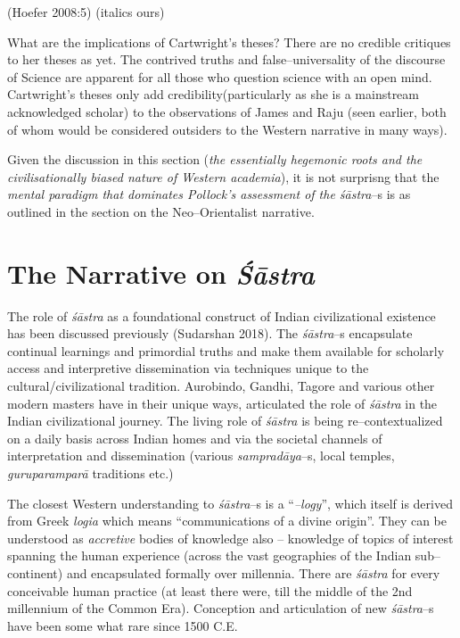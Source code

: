 \hfill (Hoefer 2008:5) (italics ours)

What are the implications of Cartwright’s theses? There are no credible critiques to her theses as yet. The contrived truths and false–universality of the discourse of Science are apparent for all those who question science with an open mind. Cartwright’s theses only add credibility(particularly as she is a mainstream acknowledged scholar) to the observations of James and Raju (seen earlier, both of whom would be considered outsiders to the Western narrative in many ways).

Given the discussion in this section (\textit{the essentially hegemonic roots and the civilisationally biased nature of Western academia}), it is not surprisng that the \textit{mental paradigm that dominates Pollock’s assessment of the śāstra}–s is as outlined in the section on the Neo–Orientalist narrative.


\section*{The Narrative on \textit{Śāstra}}

The role of \textit{śāstra} as a foundational construct of Indian civilizational existence has been discussed previously (Sudarshan 2018). The \textit{śāstra}–s encapsulate continual learnings and primordial truths and make them available for scholarly access and interpretive dissemination via techniques unique to the cultural/civilizational tradition. Aurobindo, Gandhi, Tagore and various other modern masters have in their unique ways, articulated the role of \textit{śāstra} in the Indian civilizational journey. The living role of \textit{śāstra} is being re–contextualized on a daily basis across Indian homes and via the societal channels of interpretation and dissemination (various \textit{sampradāya}–s, local temples, \textit{guruparamparā} traditions etc.)

The closest Western understanding to \textit{śāstra}–s is a “\textit{–logy}”, which itself is derived from Greek \textit{logia} which means “communications of a divine origin”. They can be understood as \textit{accretive} bodies of knowledge also – knowledge of topics of interest spanning the human experience (across the vast geographies of the Indian sub–continent) and encapsulated formally over millennia. There are \textit{śāstra} for every conceivable human practice (at least there were, till the middle of the 2nd millennium of the Common Era). Conception and articulation of new \textit{śāstra}–s have been some what rare since 1500 C.E.


